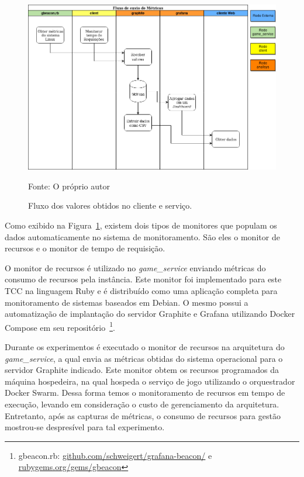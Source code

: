 \begin{figure}[htb!]
    \caption{Fluxo dos valores obtidos no cliente e serviço.}
    \label{fig:fluxo_data}
    \includegraphics[width=\textwidth]{img/cap5/fluxo_metricas.png}
    \centering
    
    Fonte: O próprio autor
\end{figure}

Como exibido na Figura~\ref{fig:fluxo_data}, existem dois tipos de monitores que populam os dados automaticamente no sistema de monitoramento.
%
São eles o monitor de recursos e  o monitor de tempo de requisição. 

O monitor de recursos é utilizado no \textit{game\_service} enviando métricas do consumo de recursos pela instância.
%
Este monitor foi implementado para este TCC na linguagem Ruby e é distribuído como uma aplicação completa para monitoramento de sistemas baseados em Debian.
%
O mesmo possui a automatização de implantação do servidor Graphite e Grafana utilizando Docker Compose em seu repositório~\footnote{gbeacon.rb: \url{github.com/schweigert/grafana-beacon/} e \url{rubygems.org/gems/gbeacon}}.

Durante os experimentos é executado o monitor de recursos na arquitetura do \textit{game\_service}, a qual envia as métricas obtidas do sistema operacional para o servidor Graphite indicado.
%
Este monitor obtem os recursos programados da máquina hospedeira, na qual hospeda o serviço de jogo utilizando o orquestrador Docker Swarm.
%
Dessa forma temos o monitoramento de recursos em tempo de execução, levando em consideração o custo de gerenciamento da arquitetura.
%
Entretanto, após as capturas de métricas, o consumo de recursos para gestão mostrou-se despresível para tal experimento.

